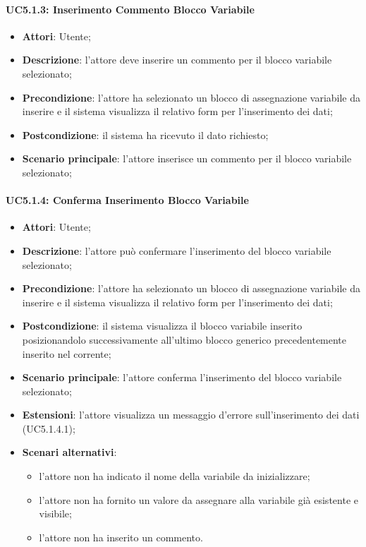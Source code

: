 \paragraph{UC5.1.3: Inserimento Commento Blocco Variabile}
\label{UC5.1.3}
\begin{itemize}
\item \textbf{Attori}: Utente;
\item \textbf{Descrizione}: l'attore deve inserire un commento per il blocco variabile selezionato;	
\item \textbf{Precondizione}: l'attore ha selezionato un blocco di assegnazione variabile da inserire e il sistema visualizza il relativo form per l'inserimento dei dati;
\item \textbf{Postcondizione}: il sistema ha ricevuto il dato richiesto;	
\item \textbf{Scenario principale}:
l'attore inserisce un commento per il blocco variabile selezionato;	
\end{itemize}

\paragraph{UC5.1.4: Conferma Inserimento Blocco Variabile}
\label{UC5.1.4}
\begin{itemize}
\item \textbf{Attori}: Utente;
\item \textbf{Descrizione}: l'attore può confermare l'inserimento del blocco variabile selezionato;	
\item \textbf{Precondizione}: l'attore ha selezionato un blocco di assegnazione variabile da inserire e il sistema visualizza il relativo form per l'inserimento dei dati;
\item \textbf{Postcondizione}: il sistema visualizza il blocco variabile inserito posizionandolo successivamente all'ultimo blocco generico precedentemente inserito nel  corrente;	
\item \textbf{Scenario principale}:
l'attore conferma l'inserimento del blocco variabile selezionato;	
\item \textbf{Estensioni}:
l'attore visualizza un messaggio d'errore sull'inserimento dei dati (UC5.1.4.1);	
\item \textbf{Scenari alternativi}:
\begin{itemize}
\item l'attore non ha indicato il nome della variabile da inizializzare;
\item l'attore non ha fornito un valore da assegnare alla variabile già esistente e visibile;
\item l'attore non ha inserito un commento.	
\end{itemize}
\end{itemize}

